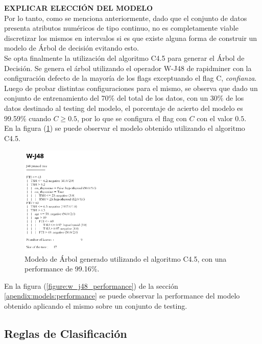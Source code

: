\documentclass[osajnl,twocolumn,showpacs,superscriptaddress,10pt,floatfix]{revtex4-1} %
\begin{document}
\textbf{EXPLICAR ELECCIÓN DEL MODELO} \\

Por lo tanto, como se menciona anteriormente, dado que el conjunto de datos presenta atributos numéricos de tipo continuo, no es completamente viable discretizar los mismos en intervalos si es que existe alguna forma de construir un modelo de Árbol de decisión evitando esto. \\

Se opta finalmente la utilización del algoritmo C4.5 para generar el Árbol de Decisión. Se genera el árbol utilizando el operador W-J48 de rapidminer con la configuración defecto de la mayoría de los flags exceptuando el flag C, \textit{confianza}. Luego de probar distintas configuraciones para el mismo, se observa que dado un conjunto de entrenamiento del 70\% del total de los datos, con un 30\% de los datos destinado al testing del modelo, el porcentaje de acierto del modelo es 99.59\% cuando $C \geq 0.5$, por lo que se configura el flag con $C$ con el valor $0.5$. \\

En la figura (\ref{figure:w_j48}) se puede observar el modelo obtenido utilizando el algoritmo C4.5.

\begin{figure}[H]
    \centering
    \includegraphics[width=0.35\textwidth]{models/w_j48}
    \caption{Modelo de Árbol generado utilizando el algoritmo C4.5, con una performance de 99.16\%.}
    \label{figure:w_j48}
\end{figure}

En la figura (\ref{figure:w_j48_performance}) de la sección \ref{apendix:models:performance} se puede observar la performance del modelo obtenido aplicando el mismo sobre un conjunto de testing. \\

\subsection{Reglas de Clasificación}
\end{document}
